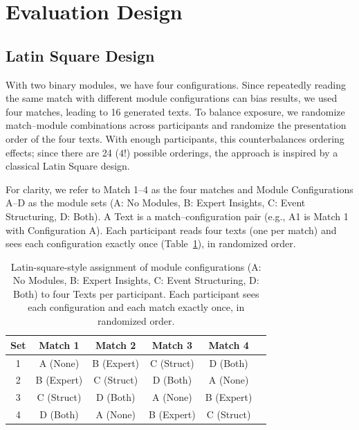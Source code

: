 \section{Evaluation Design}

\subsection{Latin Square Design}
With two binary modules, we have four configurations. Since repeatedly reading the same match with different module configurations can bias results, we used four matches, leading to 16 generated texts. To balance exposure, we randomize match--module combinations across participants and randomize the presentation order of the four texts. With enough participants, this counterbalances ordering effects; since there are 24 ($4!$) possible orderings, the approach is inspired by a classical Latin Square design.

For clarity, we refer to Match 1--4 as the four matches and Module Configurations A--D as the module sets (A: No Modules, B: Expert Insights, C: Event Structuring, D: Both). A Text is a match--configuration pair (e.g., A1 is Match 1 with Configuration A). Each participant reads four texts (one per match) and sees each configuration exactly once (Table~\ref{tab:latin-square}), in randomized order.
\begin{table}[H]
  \centering
  \begin{tabular}{cccccc}
    \toprule
    \textbf{Set} & \textbf{Match 1} & \textbf{Match 2} & \textbf{Match 3} & \textbf{Match 4} \\
    \midrule
    1            & A (None)         & B (Expert)       & C (Struct)       & D (Both) \\
    2            & B (Expert)       & C (Struct)       & D (Both)         & A (None) \\
    3            & C (Struct)       & D (Both)         & A (None)         & B (Expert) \\
    4            & D (Both)         & A (None)         & B (Expert)       & C (Struct) \\
    \bottomrule
  \end{tabular}
  \caption{Latin-square-style assignment of module configurations (A: No Modules, B: Expert Insights, C: Event Structuring, D: Both) to four Texts per participant. Each participant sees each configuration and each match exactly once, in randomized order.}
  \label{tab:latin-square}
\end{table}


